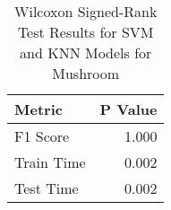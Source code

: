 \begin{table}[!htbp]
\centering
\caption{Wilcoxon Signed-Rank Test Results for SVM and KNN Models for Mushroom}
\label{tab:svm_knn_wilcoxon_comparison_mushroom}
\begin{tabular}{lr}
\toprule
Metric & P Value \\
\midrule
F1 Score & 1.000 \\
Train Time & 0.002 \\
Test Time & 0.002 \\
\bottomrule
\end{tabular}
\end{table}
